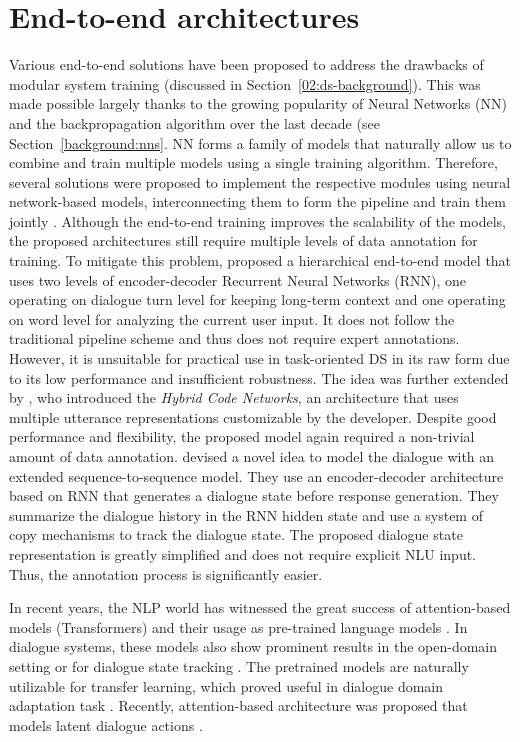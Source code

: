 \section{End-to-end architectures}
\label{relwork:end-to-end}
Various end-to-end solutions have been proposed to address the drawbacks of modular system training (discussed in Section~\ref{02:ds-background}).
This was made possible largely thanks to the growing popularity of Neural Networks (NN) and the backpropagation algorithm over the last decade (see Section~\ref{background:nns}.
NN forms a family of models that naturally allow us to combine and train multiple models using a single training algorithm.
Therefore, several solutions were proposed to implement the respective modules using neural network-based models, interconnecting them to form the pipeline and train them jointly \cite{li-etal-2017-end,wen-etal-2017-network}.
Although the end-to-end training improves the scalability of the models, the proposed architectures still require multiple levels of data annotation for training.
To mitigate this problem, \citet{serban2016building} proposed a hierarchical end-to-end model that uses two levels of encoder-decoder Recurrent Neural Networks (RNN), one operating on dialogue turn level for keeping long-term context and one operating on word level for analyzing the current user input.
It does not follow the traditional pipeline scheme and thus does not require expert annotations.
However, it is unsuitable for practical use in task-oriented DS in its raw form due to its low performance and insufficient robustness.
The idea was further extended by \citet{williams2017hybrid}, who introduced the \textit{Hybrid Code Networks}, an architecture that uses multiple utterance representations customizable by the developer.
Despite good performance and flexibility, the proposed model again required a non-trivial amount of data annotation.
\citet{lei2018sequicity} devised a novel idea to model the dialogue with an extended sequence-to-sequence model.
\label{sec:sequicity}
They use an encoder-decoder architecture based on RNN that generates a dialogue state before response generation.
They summarize the dialogue history in the RNN hidden state and use a system of copy mechanisms to track the dialogue state.
The proposed dialogue state representation is greatly simplified and does not require explicit NLU input.
Thus, the annotation process is significantly easier.

In recent years, the NLP world has witnessed the great success of attention-based models (Transformers) \cite{vaswani2017attention} and their usage as pre-trained language models \cite{devlin-etal-2019-bert}.
In dialogue systems, these models also show prominent results in the open-domain setting \cite{DBLP:journals/corr/abs-1901-08149} or for dialogue state tracking \cite{chao2019bert}.
The pretrained models are naturally utilizable for transfer learning, which proved useful in dialogue domain adaptation task \cite{shalyminov-etal-2019-shot}.
Recently, attention-based architecture was proposed that models latent dialogue actions \cite{bao2019plato}.

